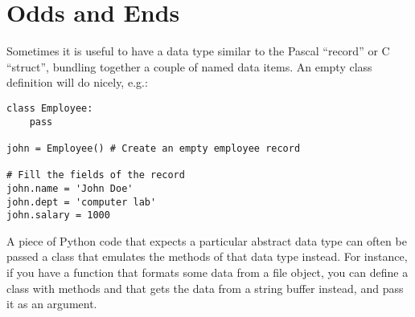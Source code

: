 \documentclass{manual}
\begin{document}

\section{Odds and Ends \label{odds}}

Sometimes it is useful to have a data type similar to the Pascal
``record'' or C ``struct'', bundling together a couple of named data
items.  An empty class definition will do nicely, e.g.:

\begin{verbatim}
class Employee:
    pass

john = Employee() # Create an empty employee record

# Fill the fields of the record
john.name = 'John Doe'
john.dept = 'computer lab'
john.salary = 1000
\end{verbatim}


A piece of Python code that expects a particular abstract data type
can often be passed a class that emulates the methods of that data
type instead.  For instance, if you have a function that formats some
data from a file object, you can define a class with methods
 and  that gets the data from a string
buffer instead, and pass it as an argument.%
\end{document}
